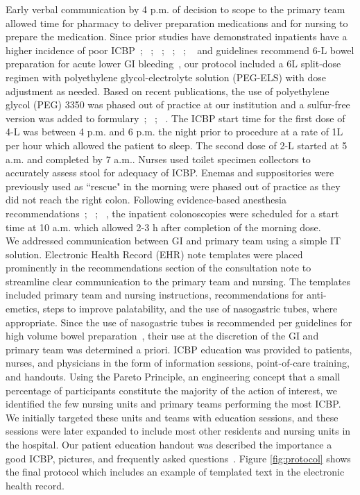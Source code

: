 \documentclass[Bprep]{subfiles}
\begin{document}
Early verbal communication by 4 p.m. of decision to scope to the primary team allowed time for pharmacy to deliver preparation medications and for nursing to prepare the medication. Since prior studies have demonstrated inpatients have a higher incidence of poor ICBP~\cite{Garber2019-rw}; ~\cite{Ness2001-ff}; ~\cite{Lebwohl2010-ti}; ~\cite{Chorev2007-ka}; ~\cite{Livovsky2017-ds}; ~\cite{Mahmood2018-xt} and guidelines recommend 6-L bowel preparation for acute lower GI bleeding~\cite{Saltzman2015-ir}, our protocol included a 6L split-dose regimen with polyethylene glycol-electrolyte solution (PEG-ELS) with dose adjustment as needed. Based on recent publications, the use of polyethylene glycol (PEG) 3350 was phased out of practice at our institution and a sulfur-free version was added to formulary~\cite{Argyropoulos2018-cg}; ~\cite{Saltzman2015-ir}; ~\cite{Hjelkrem2011-ow}. The ICBP start time for the first dose of 4-L was between 4 p.m. and 6 p.m. the night prior to procedure at a rate of 1L per hour which allowed the patient to sleep. The second dose of 2-L started at 5 a.m. and completed by 7 a.m.. Nurses used toilet specimen collectors to accurately assess stool for adequacy of ICBP. Enemas and suppositories were previously used as ``rescue" in the morning were phased out of practice as they did not reach the right colon. Following evidence-based anesthesia recommendations~\cite{Johnson2014-nm}; ~\cite{American_Society_of_Anesthesiologists_Committee2011-sw}; ~\cite{Agrawal2016-nn}, the inpatient colonoscopies were scheduled for a start time at 10 a.m. which allowed 2-3 h after completion of the morning dose.\\

We addressed communication between GI and primary team using a simple IT solution. Electronic Health Record (EHR) note templates were placed prominently in the recommendations section of the consultation note to streamline clear communication to the primary team and nursing. The templates included primary team and nursing instructions, recommendations for anti-emetics, steps to improve palatability, and the use of nasogastric tubes, where appropriate. Since the use of nasogastric tubes is recommended per guidelines for high volume bowel preparation~\cite{Saltzman2015-ir}, their use at the discretion of the GI and primary team was determined a priori. ICBP education was provided to patients, nurses, and physicians in the form of information sessions, point-of-care training, and handouts. Using the Pareto Principle, an engineering concept that a small percentage of participants
constitute the majority of the action of interest, we identified the few nursing units and primary teams performing the most ICBP. We initially targeted these units and teams with education sessions, and these sessions were later expanded to include most other residents and nursing units in the hospital. Our patient education handout was described the importance a good ICBP, pictures, and frequently asked questions~\cite{Lai2009-xr}. Figure \ref{fig:protocol} shows the final protocol which includes an example of templated text in the electronic health record.\\
\end{document}
